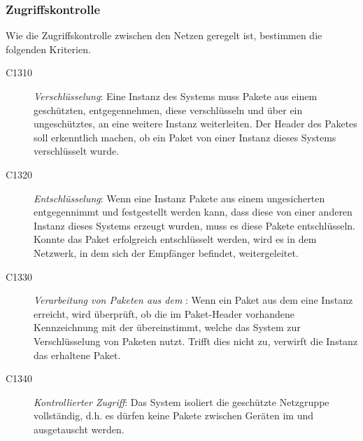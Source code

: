 \subsubsection{Zugriffskontrolle}
Wie die Zugriffskontrolle zwischen den Netzen geregelt ist, bestimmen die folgenden Kriterien.
	\begin{description}
	   \item[C1310] \textit{Verschlüsselung}: Eine Instanz des Systems muss Pakete aus einem geschützten,  entgegennehmen, diese verschlüsseln und über ein ungeschütztes,  an eine weitere Instanz weiterleiten. 
	   Der Header des Paketes soll erkenntlich machen, ob ein Paket von einer Instanz dieses Systems verschlüsselt wurde.	     
	  	  
	   \item[C1320] \textit{Entschlüsselung}: Wenn eine Instanz Pakete aus einem ungesicherten  entgegennimmt und festgestellt werden kann, dass diese von einer anderen Instanz dieses Systems erzeugt wurden, muss es diese Pakete entschlüsseln. 
	   Konnte das Paket erfolgreich entschlüsselt werden, wird es in dem Netzwerk, in dem sich der Empfänger befindet, weitergeleitet.
	  
	   \item[C1330] \textit{Verarbeitung von Paketen aus dem }: Wenn ein Paket aus dem  eine Instanz erreicht, wird überprüft, ob die im Paket-Header vorhandene Kennzeichnung mit der übereinstimmt, welche das System zur Verschlüsselung von Paketen nutzt.
	   Trifft dies nicht zu, verwirft die Instanz das erhaltene Paket.
	  	
	   \item[C1340] \textit{Kontrollierter Zugriff}: Das System isoliert die geschützte Netzgruppe vollständig, d.h. es dürfen keine Pakete zwischen Geräten im  und  ausgetauscht werden.
	  	  
	\end{description}


